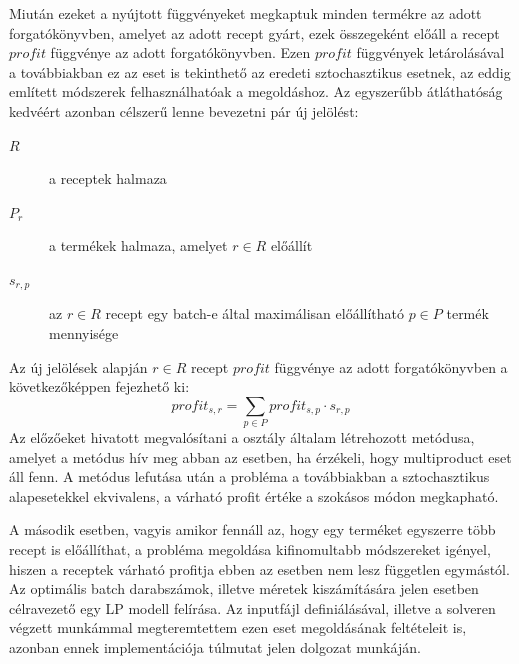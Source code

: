 Miután ezeket a nyújtott függvényeket megkaptuk minden termékre az adott forgatókönyvben, amelyet az adott recept gyárt, ezek összegeként előáll a recept $profit$ függvénye az adott forgatókönyvben.
Ezen $profit$ függvények letárolásával a továbbiakban ez az eset is tekinthető az eredeti sztochasztikus esetnek, az eddig említett módszerek felhasználhatóak a megoldáshoz.
Az egyszerűbb átláthatóság kedvéért azonban célszerű lenne bevezetni pár új jelölést:
\begin{description}
\item[$R$] a receptek halmaza
\item[$P_r$] a termékek halmaza, amelyet $r \in R$ előállít
\item[$s_{r,p}$] az $r \in R$ recept egy batch-e által maximálisan előállítható $p \in P$ termék mennyisége
\end{description}
Az új jelölések alapján $r \in R$ recept $profit$ függvénye az adott forgatókönyvben a következőképpen fejezhető ki:
$$profit_{s,r}=\sum_{p \in P} profit_{s,p} \cdot s_{r,p}$$ 
Az előzőeket hivatott megvalósítani a  osztály általam létrehozott  metódusa, amelyet a  metódus hív meg abban az esetben, ha érzékeli, hogy multiproduct eset áll fenn.
A metódus lefutása után a probléma a továbbiakban a sztochasztikus alapesetekkel ekvivalens, a várható profit értéke a szokásos módon megkapható.

A második esetben, vagyis amikor fennáll az, hogy egy terméket egyszerre több recept is előállíthat, a probléma megoldása kifinomultabb módszereket igényel, hiszen a receptek várható profitja ebben az esetben nem lesz független egymástól.
Az optimális batch darabszámok, illetve méretek kiszámítására jelen esetben célravezető egy LP modell felírása. \cite{phd_Hegyhati} Az inputfájl definiálásával, illetve a solveren végzett munkámmal megteremtettem ezen eset megoldásának feltételeit is, azonban ennek implementációja túlmutat jelen dolgozat munkáján.
